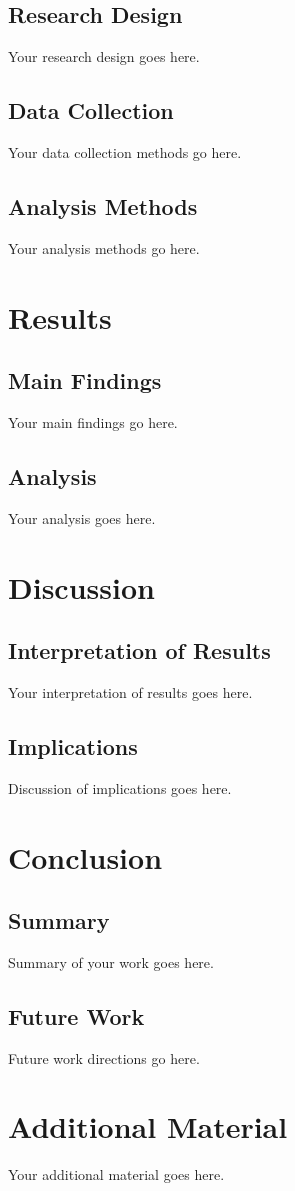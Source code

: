 \documentclass[12pt,a4paper]{report}
\begin{document}
\section{Research Design}
Your research design goes here.

\section{Data Collection}
Your data collection methods go here.

\section{Analysis Methods}
Your analysis methods go here.

\chapter{Results}
\section{Main Findings}
Your main findings go here.

\section{Analysis}
Your analysis goes here.

\chapter{Discussion}
\section{Interpretation of Results}
Your interpretation of results goes here.

\section{Implications}
Discussion of implications goes here.

\chapter{Conclusion}
\section{Summary}
Summary of your work goes here.

\section{Future Work}
Future work directions go here.

\backmatter



\appendix
\chapter{Additional Material}
Your additional material goes here.
\end{document}
